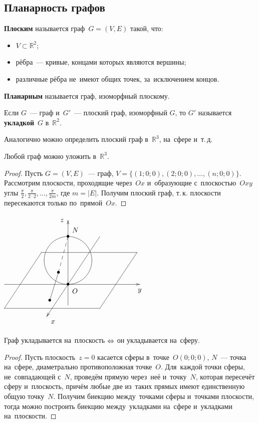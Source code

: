 \subsection{Планарность графов}
\textbf{Плоским} называется граф~$G = (V, E)$ такой, что:
\begin{itemize}
	\item $V \subset \mathbb R^2$;
	\item рёбра~--- кривые, концами которых являются вершины;
	\item различные рёбра не~имеют общих точек, за~исключением концов.
\end{itemize}

\textbf{Планарным} называется граф, изоморфный плоскому.

Если $G$~--- граф и~$G'$~--- плоский граф, изоморфный $G$, то $G'$ называется \textbf{укладкой}~$G$ в~$\mathbb R^2$.

Аналогично можно определить плоский граф в~$\mathbb R^3$, на~сфере и~т.\,д.

\begin{theorem}
Любой граф можно уложить в~$\mathbb R^3$.
\end{theorem}
\begin{proof}
Пусть $G = (V, E)$~--- граф, $V = \{ (1; 0; 0), (2; 0; 0), \ldots, (n; 0; 0) \}$.
Рассмотрим плоскости, проходящие через~$Ox$ и~образующие с~плоскостью~$Oxy$ углы
$\displaystyle \frac\pi2, \frac\pi{2\cdot2}, \ldots, \frac\pi{2m}$, где $m = |E|$.
Получим плоский граф, т.\,к. плоскости пересекаются только по~прямой~$Ox$.
\end{proof}

\begin{floatingfigure}[r]{71mm}
\noindent
$\begin{xy} /r8mm/:
(-4, 0); (4.5, 0) **@{-} *@{>} *++!U{y}; %
(0, -1.3); (0, 4) **@{-} *@{>} *++!R{z}; %
(2, 3); (-1.3333, -2) **@{-} *@{>} *++!LU{x}; %
(-4, -1.5) = "1"; (2, -1.5) = "2" **@{-};
(2.3333, 3.5) = "off";
"1"; "1"+"off" = "3" **@{-};
"2"; "2"+"off" = "4" **@{-};
"3"; "4" **@{-};
(0, 1.5) *\cir<12mm>{};
(0, 0) *{\bullet} *++!LU{O};
(0, 3) *{\bullet} *++!DL{N};
(-0.6, 0.75) = "sph" **@{--} *{\bullet};
"sph"; (-1.1467, -1) **@{-} *{\bullet};
\end{xy}$
\end{floatingfigure}
\begin{theorem}
Граф укладывается на~плоскость $\opbr\Leftrightarrow$ он укладывается на~сферу.
\end{theorem}
\begin{proof}
Пусть плоскость~$z = 0$ касается сферы в~точке~$O(0; 0; 0)$, $N$~--- точка на~сфере, диаметрально противоположная точке~$O$.
Для~каждой точки сферы, не~совпадающей с~$N$, проведём прямую через~неё и~точку~$N$, которая пересечёт сферу и~плоскость, причём любые две из~таких прямых имеют единственную общую точку~$N$.
Получим биекцию между~точками сферы и~точками плоскости, тогда можно построить биекцию между~укладками на~сфере и~укладками на~плоскости.
\end{proof}

